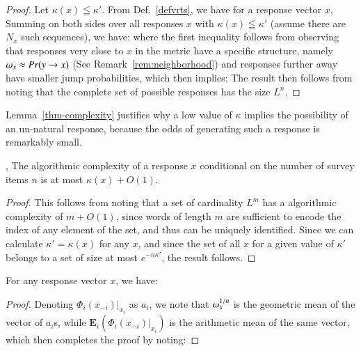 \documentclass[onecolumn,10pt]{IEEEtran}
\begin{document}
\begin{proof} Let $\kappa(x) \leqq \kappa'$. From Def.~\ref{defvrts},   we have for a response vector $x$, 
  Summing on both sides over all responses $x $ with $\kappa(x)\leqq \kappa'$ (assume there are $N_x$ such sequences), we have:
  where the first inequality follows from observing that responses very close to $x$ in the \qdist metric have a specific structure, namely $\omega_{x} \approx Pr(y \rightarrow x)$ (See Remark~\ref{rem:neighborhood}) and responses further away have smaller jump probabilities, which then  implies:
  The result then follows from noting that the complete set of possible responses has the size $L^n$.
\end{proof}
% 
Lemma~\ref{thm-complexity} justifies why a low value of $\kappa$ implies the possibility of an un-natural response, because the odds of generating such a response is remarkably small.
%
\begin{cor}
, The algorithmic complexity of a response $x$ conditional on the number of survey items $n$ is at most  $\kappa(x) + O(1) $.
\end{cor}
\begin{proof}
This follows from noting that a set of cardinality $L^m$ has a algorithmic complexity of $m + O(1)$, since words of length $m$ are sufficient to encode the index of any element of the set, and thus can be uniquely identified. Sinec we can calculate $\kappa'=\kappa(x)$ for any $x$, and since the set of all $x$ for a given value of $\kappa'$ belongs to a set of size at most $e^{ -n \kappa' }$, the result follows.
\end{proof}

\begin{lem}[Surprise]\label{thm-xtalk}
  For any response vector $x$, we have:
\end{lem}
% 
\begin{proof}
  Denoting $\Phi_i (x_{-i}) \vert_{x_i}$ as $a_i$, we note that $\omega_{x}^{1/n} $ is the geometric mean of the vector of $a_i$s, while $\mathbf{E}_i \left (   \Phi_i (x_{-i}) \vert_{x_i}   \right )$ is the arithmetic mean of the same vector, which then completes the proof by noting:
\end{proof}
% 
\end{document}
